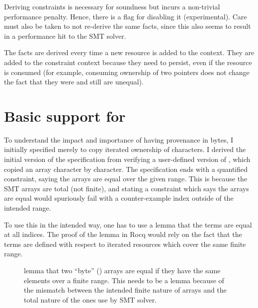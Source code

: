 Deriving constraints is necessary for soundness but incurs a non-trivial
performance penalty. Hence, there is a flag for disabling it (experimental).
Care must also be taken to not re-derive the same facts, since this also seems
to result in a performance hit to the SMT
solver.


The facts are derived every time a new resource is added to the context.
They are added to the constraint context because they need to persist,
even if the resource is consumed (for example, consuming ownership
of two pointers does not change the fact that they were and still
are unequal).


\section{Basic support for }

To understand the impact and importance of having provenance in
bytes, I initially specified  merely to copy iterated
ownership of characters. I derived the initial version of the specification
from verifying a user-defined version of , which copied an
array character by character. The specification ends with a quantified constraint,
saying the arrays are equal over the given range. This is because the SMT arrays
are total (not finite), and stating a constraint which says the arrays are equal
would spuriously fail with a counter-example index outside of the intended range.


To use this in the intended way, one has to use a lemma that the terms are
equal at all indices. The proof of the lemma in Rocq would rely on the fact
that the terms are defined with respect to iterated resources which cover the
same finite range.

\begin{figure}[h]
\caption{ lemma that two ``byte'' () arrays
    are equal if they have the same elements over a finite range. This needs
    to be a lemma because of the mismatch between the intended finite nature
    of arrays and the total nature of the ones use by SMT solver.}\label{fig:byte-array-eq-lemma}
\end{figure}

